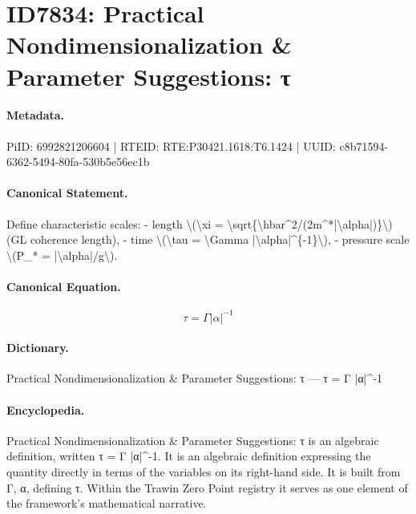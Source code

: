 \section*{ID7834: Practical Nondimensionalization \& Parameter Suggestions: τ}
\paragraph{Metadata.}
PiID: 6992821206604 | RTEID: RTE:P30421.1618:T6.1424 | UUID: c8b71594-6362-5494-80fa-530b5e56ec1b

\paragraph{Canonical Statement.}
Define characteristic scales: - length \textbackslash{}(\textbackslash{}xi = \textbackslash{}sqrt\{\textbackslash{}hbar\textasciicircum{}2/(2m\textasciicircum{}*|\textbackslash{}alpha|)\}\textbackslash{}) (GL coherence length), - time \textbackslash{}(\textbackslash{}tau = \textbackslash{}Gamma |\textbackslash{}alpha|\textasciicircum{}\{-1\}\textbackslash{}), - pressure scale \textbackslash{}(P\_* = |\textbackslash{}alpha|/g\textbackslash{}).

\paragraph{Canonical Equation.}
\[
\tau = \Gamma |\alpha|^{-1}
\]

\paragraph{Dictionary.}
Practical Nondimensionalization \& Parameter Suggestions: τ — τ = Γ |α|\textasciicircum{}-1

\paragraph{Encyclopedia.}
Practical Nondimensionalization \& Parameter Suggestions: τ is an algebraic definition, written τ = Γ |α|\textasciicircum{}-1. It is an algebraic definition expressing the quantity directly in terms of the variables on its right-hand side. It is built from Γ, α, defining τ. Within the Trawin Zero Point registry it serves as one element of the framework's mathematical narrative.
